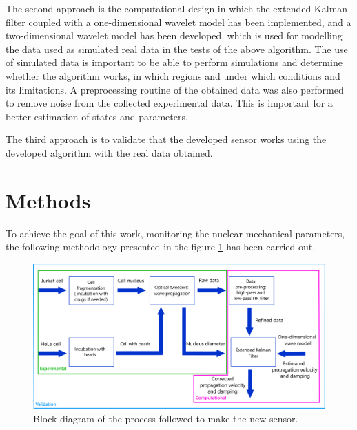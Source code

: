 \documentclass[12pt, a4paper]{article} %
\begin{document}
The second approach is the computational design in which the extended Kalman filter coupled with a one-dimensional wavelet model has been implemented, and a two-dimensional wavelet model has been developed, which is used for modelling the data used as simulated real data in the tests of the above algorithm.  The use of simulated data is important to be able to perform simulations and determine whether the algorithm works, in which regions and under which conditions and its limitations. A preprocessing routine of the obtained data was also performed to remove noise from the collected experimental data. This is important for a better estimation of states and parameters.

The third approach is to validate that the developed sensor works using the developed algorithm with the real data obtained. 

\newpage
\setlength{\parskip}{0mm}

\section{Methods}

To achieve the goal of this work, monitoring the nuclear mechanical parameters, the following methodology presented in the figure \ref{fig:esquema_trabajo} has been carried out.

\begin{figure}[htbp]
  \centering
  \includegraphics[width=1\textwidth]{figures/esquema_trabajo_metodos_2.png}
  \caption{Block diagram of the process followed to make the new sensor.}
  \label{fig:esquema_trabajo}
\end{figure}
\end{document}
